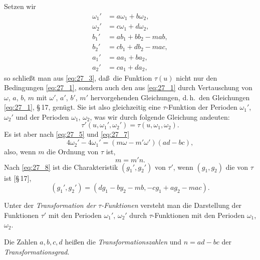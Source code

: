 \documentclass[12pt,a4paper]{article}
\begin{document}
Setzen wir
\begin{equation}\label{eq:27_7}
\begin{aligned}
\omega_1' &= a\omega_1+b\omega_2,\\
\omega_2' &= c\omega_1+d\omega_2,\\
b_1' &= ab_1+bb_2-mab,\\
b_2' &= cb_1+db_2-mac,\\
a_1' &= aa_1+ba_2,\\
a_2' &= ca_1+da_2,
\end{aligned}
\end{equation}
so schlie\ss t man aus \eqref{eq:27_3}, da\ss\ die Funktion $\tau(u)$ nicht nur den Bedingungen \eqref{eq:27_1}, sondern auch den aus \eqref{eq:27_1} durch Vertauschung von $\omega$, $a$, $b$, $m$ mit $\omega'$, $a'$, $b'$, $m'$ hervorgehenden Gleichungen, d.\,h.\ den Gleichungen \eqref{eq:27_1}, \S\,17, gen\"ugt. Sie ist also gleichzeitig eine $\tau$-Funktion der Perioden $\omega_1'$, $\omega_2'$ und der Perioden $\omega_1$, $\omega_2$, was wir durch folgende Gleichung andeuten:
\begin{equation}\label{eq:27_9}
\tau'(u,\omega_1',\omega_2') = \tau(u,\omega_1,\omega_2).
\end{equation}
Es ist aber nach \eqref{eq:27_5} und \eqref{eq:27_7}
\[
4\omega_2'-4\omega_1' = (m\omega-m'\omega')(ad-bc),
\]
also, wenn $m$ die Ordnung von $\tau$ ist,
\begin{equation}\label{eq:27_10}
m = m'n.
\end{equation}
Nach \eqref{eq:27_8} ist die Charakteristik $(g_1',g_2')$ von $\tau'$, wenn $(g_1,g_2)$ die von $\tau$ ist [\S\,17],
\begin{equation}\label{eq:27_11}
(g_1',g_2') = (dg_1-by_2-mb, -cg_1+ag_2-mac).
\end{equation}

\newpage
\noindent
Unter der \emph{Transformation der $\tau$-Funktionen} versteht man die Darstellung der Funktionen $\tau'$ mit den Perioden $\omega_1'$, $\omega_2'$ durch $\tau$-Funktionen mit den Perioden $\omega_1$, $\omega_2$.

Die Zahlen $a,b,c,d$ hei\ss en die \emph{Transformationszahlen} und $n=ad-bc$ der \emph{Transformationsgrad}.
\end{document}

